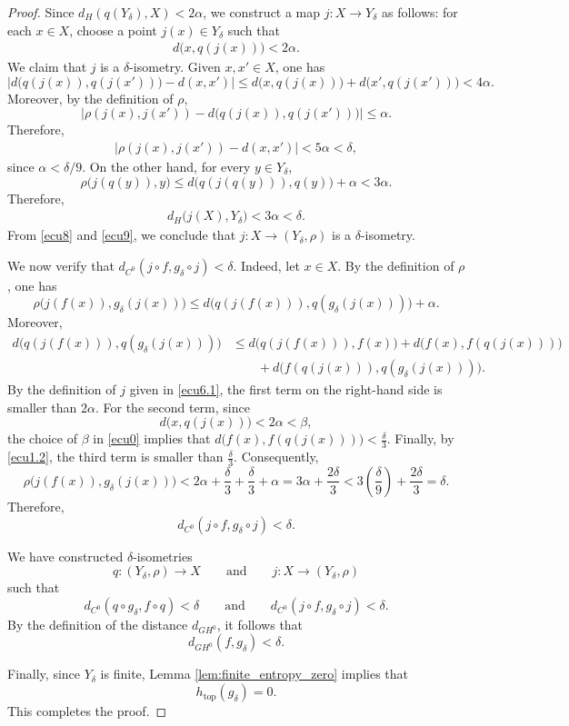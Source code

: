 \documentclass{amsart}
\numberwithin{equation}{section}
\theoremstyle{remark}
\DeclareMathOperator{\topo}{top}
\begin{document}
\begin{proof}
Since $d_H(q(Y_\delta),X)<2\alpha$, we construct a map $j:X\to Y_\delta$ as follows: for each $x\in X$, choose a point $j(x)\in Y_\delta$ such that
\begin{eqnarray}\label{ecu6.1}
d\bigl(x,q(j(x))\bigr)<2\alpha.
\end{eqnarray}
We claim that $j$ is a $\delta$-isometry. Given $x,x'\in X$, one has
\[
\bigl|d\bigl(q(j(x)),q(j(x'))\bigr)-d(x,x')\bigr|
\le
 d\bigl(x,q(j(x))\bigr)+d\bigl(x',q(j(x'))\bigr)
<
4\alpha.
\]
Moreover, by the definition of $\rho$,
\[
\bigl|\rho(j(x),j(x'))-d\bigl(q(j(x)),q(j(x'))\bigr)\bigr|
\le \alpha.
\]
Therefore,
\begin{eqnarray}\label{ecu8}
\bigl|\rho(j(x),j(x'))-d(x,x')\bigr|
<
5\alpha
<
\delta,
\end{eqnarray}
since $\alpha<\delta/9$. On the other hand, for every $y\in Y_\delta$,
\[
\rho\bigl(j(q(y)),y\bigr)
\le
 d\bigl(q(j(q(y))),q(y)\bigr)+\alpha
<
3\alpha.
\]
Therefore,
\begin{eqnarray}\label{ecu9}
d_H\bigl(j(X),Y_\delta\bigr)<3\alpha<\delta.
\end{eqnarray}
From \eqref{ecu8} and \eqref{ecu9}, we conclude that $j:X\to (Y_\delta,\rho)$
is a $\delta$-isometry.
\vspace{0.3cm}

We now verify that $d_{C^0}(j\circ f,g_\delta\circ j)<\delta$. Indeed, let $x\in X$. By the definition of $\rho$, one has
\[
\rho\bigl(j(f(x)),g_\delta(j(x))\bigr)
\le
 d\bigl(q(j(f(x))),q(g_\delta(j(x)))\bigr)+\alpha.
\]
Moreover,
\[
\begin{aligned}
d\bigl(q(j(f(x))),q(g_\delta(j(x)))\bigr)
&\le
 d\bigl(q(j(f(x))),f(x)\bigr)
+d\bigl(f(x),f(q(j(x)))\bigr)\\
&\qquad
+d\bigl(f(q(j(x))),q(g_\delta(j(x)))\bigr).
\end{aligned}
\]
By the definition of $j$ given in \eqref{ecu6.1}, the first term on the right-hand side is smaller than $2\alpha$. For the second term, since
\[
d\bigl(x,q(j(x))\bigr)<2\alpha<\beta,
\]
the choice of $\beta$ in \eqref{ecu0} implies that $d\bigl(f(x),f(q(j(x)))\bigr)<\frac{\delta}{3}$.
Finally, by \eqref{ecu1.2}, the third term is smaller than $\frac{\delta}{3}$. Consequently,
\[
\rho\bigl(j(f(x)),g_\delta(j(x))\bigr)
<
2\alpha+\frac{\delta}{3}+\frac{\delta}{3}+\alpha
=
3\alpha+\frac{2\delta}{3}
<
3\left(\frac{\delta}{9}\right)+\frac{2\delta}{3}
=
\delta.
\]
Therefore,
\[
d_{C^0}(j\circ f,g_\delta\circ j)<\delta.
\]

We have constructed $\delta$-isometries
\[
q:(Y_\delta,\rho)\to X
\qquad\text{and}\qquad
j:X\to (Y_\delta,\rho)
\]
such that
\[
d_{C^0}(q\circ g_\delta,f\circ q)<\delta
\qquad\text{and}\qquad
d_{C^0}(j\circ f,g_\delta\circ j)<\delta.
\]
By the definition of the distance $d_{GH^0}$, it follows that
\[
d_{GH^0}(f,g_\delta)<\delta.
\]

Finally, since $Y_\delta$ is finite, Lemma \ref{lem:finite_entropy_zero} implies that
\[
h_{\topo}(g_\delta)=0.
\]
This completes the proof.
\end{proof}
\end{document}
